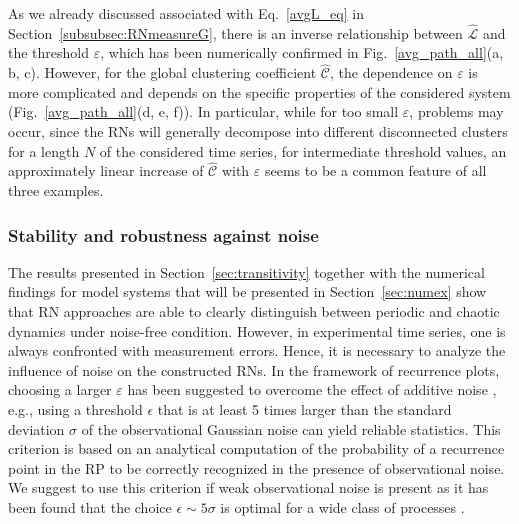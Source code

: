 		 As we already discussed associated with Eq.~\eqref{avgL_eq} in Section~\ref{subsubsec:RNmeasureG}, there is an inverse relationship between $\hat{\mathcal{L}}$ and the threshold $\varepsilon$, which has been numerically confirmed in Fig.~\ref{avg_path_all}(a, b, c). However, for the global clustering coefficient $\hat{\mathcal{C}}$, the dependence on $\varepsilon$ is more complicated and depends on the specific properties of the considered system (Fig.~\ref{avg_path_all}(d, e, f)). In particular, while for too small $\varepsilon$, problems may occur, since the RNs will generally decompose into different disconnected clusters for a length $N$ of the considered time series, for intermediate threshold values, an approximately linear increase of $\hat{\mathcal{C}}$ with $\varepsilon$ seems to be a common feature of all three examples.

		\subsubsection{Stability and robustness against noise}
        		The results presented in Section~\ref{sec:transitivity} together with the numerical findings for model systems that will be presented in Section~\ref{sec:numex} show that RN approaches are able to clearly distinguish between periodic and chaotic dynamics under noise-free condition. However, in experimental time series, one is always confronted with measurement errors. Hence, it is necessary to analyze the influence of noise on the constructed RNs. In the framework of recurrence plots, choosing a larger $\varepsilon$ has been suggested to overcome the effect of additive noise \cite{thiel2002}, e.g., using a threshold $\epsilon$ that is at least 5 times larger than the standard deviation $\sigma$ of the observational Gaussian noise can yield reliable statistics. This criterion is based on an analytical computation of the probability of a recurrence point in the RP to be correctly recognized in the presence of observational noise. We suggest to use this criterion if weak observational noise is present as it has been found that the choice $\epsilon \sim 5\sigma$ is optimal for a wide class of processes \cite{thiel2002}.

